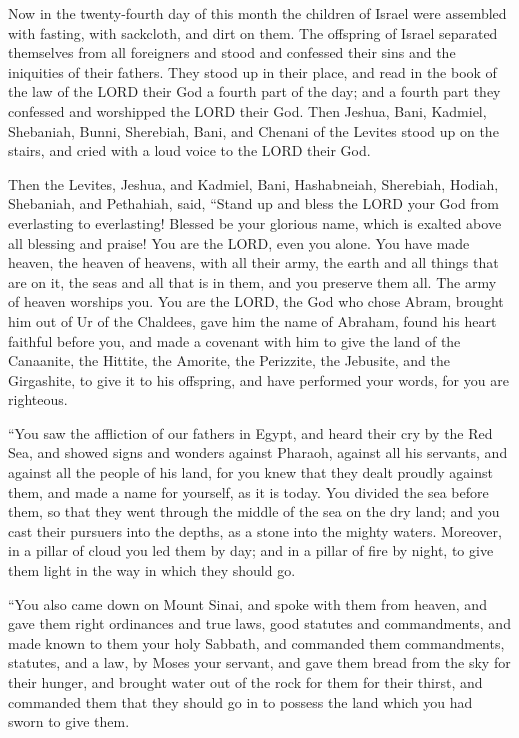  Now in the twenty-fourth day of this month the children of
Israel were assembled with fasting, with sackcloth, and dirt on them.
 The offspring of Israel separated themselves from all
foreigners and stood and confessed their sins and the iniquities of
their fathers.  They stood up in their place, and read in
the book of the law of the LORD their God a fourth part of the day; and
a fourth part they confessed and worshipped the LORD their God.
 Then Jeshua, Bani, Kadmiel, Shebaniah, Bunni, Sherebiah,
Bani, and Chenani of the Levites stood up on the stairs, and cried with
a loud voice to the LORD their God.

 Then the Levites, Jeshua, and Kadmiel, Bani, Hashabneiah,
Sherebiah, Hodiah, Shebaniah, and Pethahiah, said, ``Stand up and bless
the LORD your God from everlasting to everlasting! Blessed be your
glorious name, which is exalted above all blessing and praise!
 You are the LORD, even you alone. You have made heaven, the
heaven of heavens, with all their army, the earth and all things that
are on it, the seas and all that is in them, and you preserve them all.
The army of heaven worships you.  You are the LORD, the God
who chose Abram, brought him out of Ur of the Chaldees, gave him the
name of Abraham,  found his heart faithful before you, and
made a covenant with him to give the land of the Canaanite, the Hittite,
the Amorite, the Perizzite, the Jebusite, and the Girgashite, to give it
to his offspring, and have performed your words, for you are righteous.

 ``You saw the affliction of our fathers in Egypt, and heard
their cry by the Red Sea,  and showed signs and wonders
against Pharaoh, against all his servants, and against all the people of
his land, for you knew that they dealt proudly against them, and made a
name for yourself, as it is today.  You divided the sea
before them, so that they went through the middle of the sea on the dry
land; and you cast their pursuers into the depths, as a stone into the
mighty waters.  Moreover, in a pillar of cloud you led them
by day; and in a pillar of fire by night, to give them light in the way
in which they should go.

 ``You also came down on Mount Sinai, and spoke with them
from heaven, and gave them right ordinances and true laws, good statutes
and commandments,  and made known to them your holy
Sabbath, and commanded them commandments, statutes, and a law, by Moses
your servant,  and gave them bread from the sky for their
hunger, and brought water out of the rock for them for their thirst, and
commanded them that they should go in to possess the land which you had
sworn to give them.

